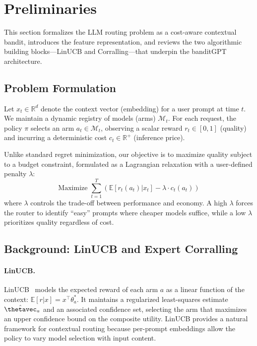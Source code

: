 \section{Preliminaries}
\label{sec:preliminaries}

This section formalizes the LLM routing problem as a cost-aware contextual bandit, introduces the feature representation, and reviews the two algorithmic building blocks---LinUCB and Corralling---that underpin the banditGPT architecture.

\subsection{Problem Formulation}
\label{sec:formulation}

Let $x_t \in \mathbb{R}^d$ denote the context vector (embedding) for a user prompt at time $t$. We maintain a dynamic registry of models (arms) $\mathcal{M}_t$. For each request, the policy $\pi$ selects an arm $a_t \in \mathcal{M}_t$, observing a scalar reward $r_t \in [0, 1]$ (quality) and incurring a deterministic cost $c_t \in \mathbb{R}^+$ (inference price).

Unlike standard regret minimization, our objective is to maximize quality subject to a budget constraint, formulated as a Lagrangian relaxation with a user-defined penalty $\lambda$:
\begin{equation}
\text{Maximize } \sum_{t=1}^T \left( \mathbb{E}[r_t(a_t) | x_t] - \lambda \cdot c_t(a_t) \right)
\end{equation}
where $\lambda$ controls the trade-off between performance and economy. A high $\lambda$ forces the router to identify ``easy'' prompts where cheaper models suffice, while a low $\lambda$ prioritizes quality regardless of cost.

\subsection{Background: LinUCB and Expert Corralling}
\label{sec:background}

\paragraph{LinUCB.}
LinUCB~\cite{li2010contextual} models the expected reward of each arm $a$ as a linear function of the context: $\mathbb{E}[r | x] = x^\top \theta^*_a$. It maintains a regularized least-squares estimate $\hat{\thetavec}_a$ and an associated confidence set, selecting the arm that maximizes an upper confidence bound on the composite utility. LinUCB provides a natural framework for contextual routing because per-prompt embeddings allow the policy to vary model selection with input content.

